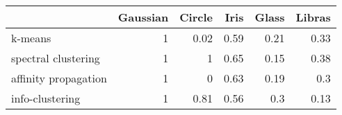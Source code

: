 \begin{tabular}{lrrrrr}
\hline
                      &   Gaussian &   Circle &   Iris &   Glass &   Libras \\
\hline
 k-means              &          1 &     0.02 &   0.59 &    0.21 &     0.33 \\
 spectral clustering  &          1 &     1    &   0.65 &    0.15 &     0.38 \\
 affinity propagation &          1 &     0    &   0.63 &    0.19 &     0.3  \\
 info-clustering      &          1 &     0.81 &   0.56 &    0.3  &     0.13 \\
\hline
\end{tabular}